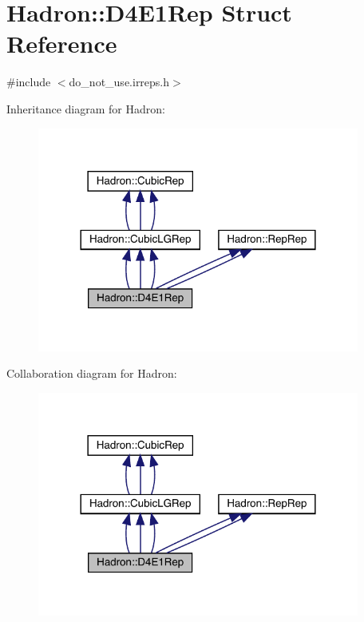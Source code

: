 \hypertarget{structHadron_1_1D4E1Rep}{}\section{Hadron\+:\+:D4\+E1\+Rep Struct Reference}
\label{structHadron_1_1D4E1Rep}


{\ttfamily \#include $<$do\+\_\+not\+\_\+use.\+irreps.\+h$>$}



Inheritance diagram for Hadron\+:
\nopagebreak
\begin{figure}[H]
\begin{center}
\leavevmode
\includegraphics[width=300pt]{db/deb/structHadron_1_1D4E1Rep__inherit__graph}
\end{center}
\end{figure}


Collaboration diagram for Hadron\+:
\nopagebreak
\begin{figure}[H]
\begin{center}
\leavevmode
\includegraphics[width=300pt]{da/d19/structHadron_1_1D4E1Rep__coll__graph}
\end{center}
\end{figure}
